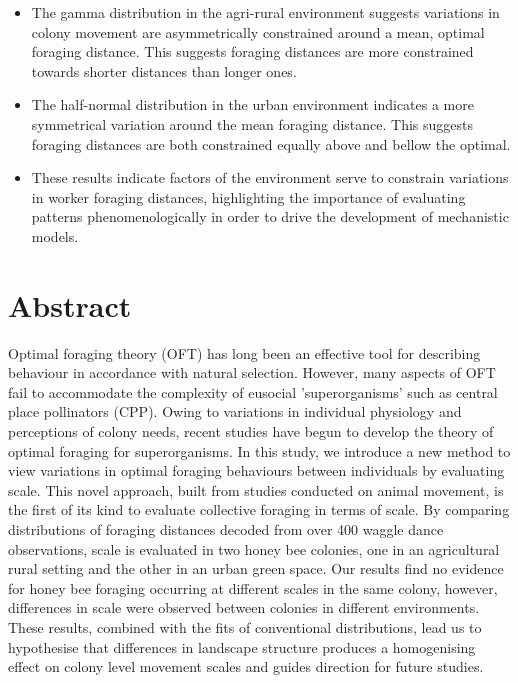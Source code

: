 \documentclass[11pt,usenames,dvipsnames]{article}
\begin{document}
\begin{itemize}
	\item The gamma distribution in the agri-rural environment suggests variations in colony movement are asymmetrically constrained around a mean, optimal foraging distance. This suggests foraging distances are more constrained towards shorter distances than longer ones.
	\item The half-normal distribution in the urban environment indicates a more symmetrical variation around the mean foraging distance. This suggests foraging distances are both constrained equally above and bellow the optimal.
	\item These results indicate factors of the environment serve to constrain variations in worker foraging distances, highlighting the importance of evaluating patterns phenomenologically in order to drive the development of mechanistic models.
	
\end{itemize}

\section{Abstract}

\begin{linenumbers}
Optimal foraging theory (OFT) has long been an effective tool for describing behaviour in accordance with natural selection. However, many aspects of OFT fail to accommodate the complexity of eusocial 'superorganisms' such as central place pollinators (CPP). Owing to variations in individual physiology and perceptions of colony needs, recent studies have begun to develop the theory of optimal foraging for superorganisms. In this study, we introduce a new method to view variations in optimal foraging behaviours between individuals by evaluating scale. This novel approach, built from studies conducted on animal movement, is the first of its kind to evaluate collective foraging in terms of scale. By comparing distributions of foraging distances decoded from over 400 waggle dance observations, scale is evaluated in two honey bee colonies, one in an agricultural rural setting and the other in an urban green space. Our results find no evidence for honey bee foraging occurring at different scales in the same colony, however, differences in scale were observed between colonies in different environments. These results, combined with the fits of conventional distributions, lead us to hypothesise that differences in landscape structure produces a homogenising effect on colony level movement scales and guides direction for future studies.
\end{linenumbers}
\end{document}
